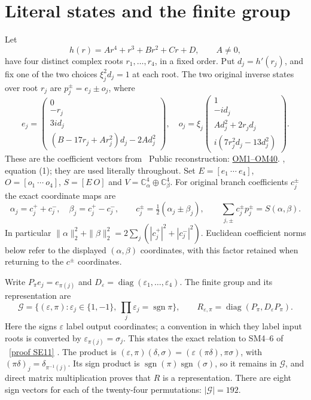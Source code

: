 \documentclass[11pt]{article}
\newcommand{\C}{\mathbb C}
\newcommand{\diag}{\operatorname{diag}}
\newcommand{\sgn}{\operatorname{sgn}}
\newcommand{\eps}{\varepsilon}
\begin{document}
\section{Literal states and the finite group}
Let
\[
 h(r)=Ar^4+r^3+Br^2+Cr+D,\qquad A\ne0,
 \tag{OM1}
\]
have four distinct complex roots $r_1,\ldots,r_4$, in a fixed order.
Put $d_j=h'(r_j)$, and fix one of the two choices
$\xi_j^2d_j=1$ at each root.  The two original inverse states over
root $r_j$ are $p_j^\pm=e_j\pm o_j$, where
\[
e_j=\begin{pmatrix}
0\\-r_j\\3id_j\\(B-17r_j+Ar_j^2)d_j-2Ad_j^2
\end{pmatrix},\quad
o_j=\xi_j\begin{pmatrix}
1\\-id_j\\Ad_j^2+2r_jd_j\\i(7r_j^2d_j-13d_j^2)
\end{pmatrix}.
\tag{OM2}
\]
These are the coefficient vectors from \cite{Incoming}%
~Public reconstruction: \href{https://github.com/KokunoYumeto/zeta-function-research-reader/blob/689a8f87e9c12b7a99b01b3123438c6751ee608f/workbenches/splitzero-tandem/continuations/20260920-native-secular-frame/ORBIT_METRIC_DERIVATION.tex\#L38}{OM1--OM40}.%
{}, equation (1);
they are used literally throughout.  Set $E=[e_1\ \cdots\ e_4]$,
$O=[o_1\ \cdots\ o_4]$, $S=[E\ O]$ and
$V=\C^4_\alpha\oplus\C^4_\beta$.  For original branch coefficients
$c_j^\pm$ the exact coordinate maps are
\[
\alpha_j=c_j^++c_j^-,\quad \beta_j=c_j^+-c_j^-,
\qquad c_j^\pm=\tfrac12(\alpha_j\pm\beta_j),
\qquad \sum_{j,\pm}c_j^\pm p_j^\pm=S(\alpha,\beta).
\tag{OM3}
\]
In particular $\|\alpha\|_2^2+\|\beta\|_2^2=
2\sum_j(|c_j^+|^2+|c_j^-|^2)$.  Euclidean coefficient norms below
refer to the displayed $(\alpha,\beta)$ coordinates, with this factor
retained when returning to the $c^\pm$ coordinates.

Write $P_\pi e_j=e_{\pi(j)}$ and $D_\eps=\diag(\eps_1,\ldots,\eps_4)$.
The finite group and its representation are
\[
\mathcal G=\{(\eps,\pi):\eps_j\in\{1,-1\},
       \ \prod_j\eps_j=\sgn\pi\},\qquad
R_{\eps,\pi}=\diag(P_\pi,D_\eps P_\pi).
\tag{OM4}
\]
Here the signs $\eps$ label output coordinates; a convention in which
they label input roots is converted by $\eps_{\pi(j)}=\sigma_j$.
This states the exact relation to SM4--6 of \cite{Fable}%
~\href{https://github.com/KokunoYumeto/zeta-function-research-reader/blob/5992ad50c0f2a06921f1fcaded7b4e38097c0739/workbenches/splitzero-tandem/continuations/20260920-original-kernel-mixed-determinants/providers/FABLE_TO_ORIGINAL_CONDUCTOR.tex\#L1967}{[proof SE11]}%
{}.
The product is
$(\eps,\pi)(\delta,\sigma)=(\eps\,(\pi\delta),\pi\sigma)$, with
$(\pi\delta)_j=\delta_{\pi^{-1}(j)}$.  Its sign product is
$\sgn(\pi)\sgn(\sigma)$, so it remains in $\mathcal G$, and direct
matrix multiplication proves that $R$ is a representation.  There
are eight sign vectors for each of the twenty-four permutations:
$|\mathcal G|=192$.
\end{document}
